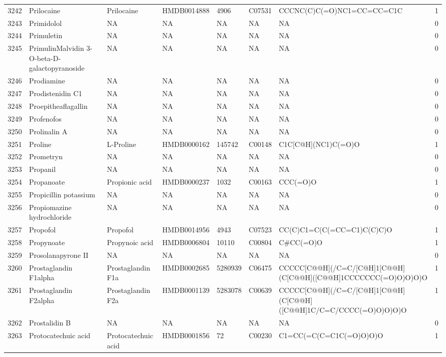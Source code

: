 \documentclass[a4paper]{article}
\begin{document}
\begin{longtable}{rlllllll}
  3242 & Prilocaine & Prilocaine & HMDB0014888 & 4906 & C07531 & CCCNC(C)C(=O)NC1=CC=CC=C1C & 1 \\ 
  3243 & Primidolol & NA & NA & NA & NA & NA & 0 \\ 
  3244 & Primuletin & NA & NA & NA & NA & NA & 0 \\ 
  3245 & PrimulinMalvidin 3-O-beta-D-galactopyranoside & NA & NA & NA & NA & NA & 0 \\ 
  3246 & Prodiamine & NA & NA & NA & NA & NA & 0 \\ 
  3247 & Prodistenidin C1 & NA & NA & NA & NA & NA & 0 \\ 
  3248 & Proepitheaflagallin & NA & NA & NA & NA & NA & 0 \\ 
  3249 & Profenofos & NA & NA & NA & NA & NA & 0 \\ 
  3250 & Prolinalin A & NA & NA & NA & NA & NA & 0 \\ 
  3251 & Proline & L-Proline & HMDB0000162 & 145742 & C00148 & C1C[C@H](NC1)C(=O)O & 1 \\ 
  3252 & Prometryn & NA & NA & NA & NA & NA & 0 \\ 
  3253 & Propanil & NA & NA & NA & NA & NA & 0 \\ 
  3254 & Propanoate & Propionic acid & HMDB0000237 & 1032 & C00163 & CCC(=O)O & 1 \\ 
  3255 & Propicillin potassium & NA & NA & NA & NA & NA & 0 \\ 
  3256 & Propiomazine hydrochloride & NA & NA & NA & NA & NA & 0 \\ 
  3257 & Propofol & Propofol & HMDB0014956 & 4943 & C07523 & CC(C)C1=C(C(=CC=C1)C(C)C)O & 1 \\ 
  3258 & Propynoate & Propynoic acid & HMDB0006804 & 10110 & C00804 & C\#CC(=O)O & 1 \\ 
  3259 & Prosolanapyrone II & NA & NA & NA & NA & NA & 0 \\ 
  3260 & Prostaglandin F1alpha & Prostaglandin F1a & HMDB0002685 & 5280939 & C06475 & CCCCC[C@@H](/C=C/[C@H]1[C@@H](C[C@@H]([C@@H]1CCCCCCC(=O)O)O)O)O & 1 \\ 
  3261 & Prostaglandin F2alpha & Prostaglandin F2a & HMDB0001139 & 5283078 & C00639 & CCCCC[C@@H](/C=C/[C@H]1[C@@H](C[C@@H]([C@@H]1C/C=C/CCCC(=O)O)O)O)O & 1 \\ 
  3262 & Prostalidin B & NA & NA & NA & NA & NA & 0 \\ 
  3263 & Protocatechuic acid & Protocatechuic acid & HMDB0001856 & 72 & C00230 & C1=CC(=C(C=C1C(=O)O)O)O & 1 \\ 

\end{longtable}
\end{document}
